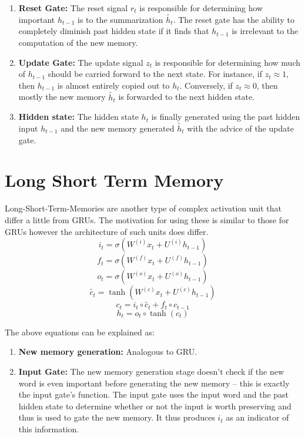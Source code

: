 \documentclass{article}
\begin{document}
\begin{appendices}
\begin{enumerate}
		\item \textbf{Reset Gate:} The reset signal \(r_t\) is responsible for determining how important \(h_{t-1}\) is to the summarization \(\widetilde{h_t}\). The reset gate has the ability to completely diminish past hidden state if it finds that \(h_{t-1}\) is irrelevant to the computation of the new memory.
		
		\item \textbf{Update Gate:} The update signal \(z_t\) is responsible for determining how much of \(h_{t-1}\) should be carried forward to the next state. For instance, if \(z_t \approx 1\), then \(h_{t-1}\) is almost entirely copied out to \(h_t\). Conversely, if \(z_t \approx 0\), then mostly the new memory \(\widetilde{h_t}\) is forwarded to the next hidden state.
		
		\item \textbf{Hidden state:} The hidden state \(h_t\) is finally generated using the past hidden input \(h_{t-1}\) and the new memory generated \(\widetilde{h_t}\) with the advice of the update gate.
		
	\end{enumerate}

\section{Long Short Term Memory}
\label{sec:lstm}

	Long-Short-Term-Memories are another type of complex activation unit that differ a little from GRUs. The motivation for using these is similar to those for GRUs however the architecture of such units does differ.
	\[
	i_t = \sigma (W^{(i)}x_t + U^{(i)}h_{t-1}) \tag{Input Gate}
	\]
	\[
	f_t = \sigma (W^{(f)}x_t + U^{(f)}h_{t-1}) \tag{Forget Gate}
	\]
	\[
	o_t = \sigma (W^{(o)}x_t + U^{(o)}h_{t-1}) \tag{Output Gate}
	\]
	\[
	\widetilde{c_t} = \tanh (W^{(c)}x_t + U^{(c)}h_{t-1}) \tag{New Memory Cell}
	\]
	\[
	c_t = i_t \circ \widetilde{c_t} + f_t \circ c_{t-1} \tag{Final Memory Cell}
	\]
	\[
	h_t = o_t \circ \tanh (c_t)
	\]
	
	The above equations can be explained as:
	
	\begin{enumerate}
		
		\item \textbf{New memory generation:} Analogous to GRU.
		 		
		\item \textbf{Input Gate:} The new memory generation stage doesn’t check if the new word is even important before generating the new memory – this is exactly the input gate’s function. The input gate uses the input word and the past hidden state to determine whether or not the input is worth preserving and thus is used to gate the new memory. It thus produces \(i_t\) as an indicator of this information.
		

\end{enumerate}
\end{appendices}
\end{document}
